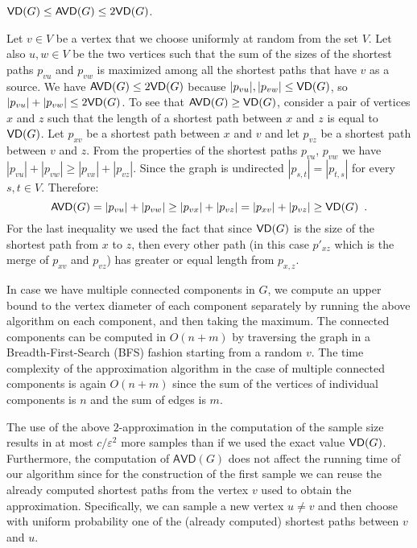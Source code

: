 \begin{lemma}\label{lem:diam}
  $\mathsf{VD}(G)\le\mathsf{AVD}(G)\le 2\mathsf{VD}(G)$.
\end{lemma}
\begin{IEEEproof}
  Let $v\in V$ be a vertex that we choose uniformly at random from the set $V$.
  Let also $u,w\in V$ be the two vertices such that the sum of the sizes of the
  shortest paths $p_{vu}$ and $p_{vw}$ is maximized among all the shortest paths
  that have $v$ as a source.  We have $\mathsf{AVD}(G)\le 2\mathsf{VD}(G)$ because
  $|p_{vu}|,|p_{vw}|\le\mathsf{VD}(G)$, so $|p_{vu}|+|p_{vw}|\le 2\mathsf{VD}(G)$. To see
  that $\mathsf{AVD}(G)\ge\mathsf{VD}(G)$, consider a pair of vertices $x$ and $z$ such
  that the length of a shortest path between $x$ and $z$ is equal to $\mathsf{VD}(G)$.
  Let $p_{xv}$ be a shortest path between $x$ and $v$ and let $p_{vz}$ be a
  shortest path between $v$ and $z$. 
  From the properties of the shortest paths $p_{vu}$, $p_{vw}$ we have
  $|p_{vu}|+|p_{vw}|\geq |p_{vx}|+|p_{vz}|$. Since the graph is undirected
  $|p_{s,t}|=|p_{t,s}|$ for every $s,t\in V$.
  Therefore:
  \[
    \mathsf{AVD}(G) = |p_{vu}|+|p_{vw}|\geq |p_{vx}|+|p_{vz}| =
    |p_{xv}|+|p_{vz}|\ge\mathsf{VD}(G)\enspace. 
  \]
  For the last inequality we used the fact that since $\mathsf{VD}(G)$ is the size of
  the shortest path from $x$ to $z$, then every other path (in this case
  $p'_{xz}$ which is the merge of $p_{xv}$ and $p_{vz}$) has greater or equal
  length from $p_{x,z}$.
\end{IEEEproof}

In case we have multiple connected components in $G$, we compute an upper bound
to the vertex diameter of each component separately by running the above
algorithm on each component, and then taking the maximum. 
The connected components can be computed in $O(n+m)$ by traversing the graph in
a Breadth-First-Search (BFS) fashion starting from a random $v$.
The time complexity of the approximation algorithm in the case of multiple
connected components is again $O(n+m)$ since the sum of the vertices of
individual components is $n$ and the sum of edges is $m$. 

The use of the above $2$-approximation in the computation of the
sample size results in at most $c/\varepsilon^2$ more samples than if we
used the exact value $\mathsf{VD}(G)$. Furthermore, the computation of $\mathsf{AVD}(G)$
does not affect the running time of our algorithm since for the construction of
the first sample we can reuse the already computed shortest paths from the
vertex $v$ used to obtain the approximation. Specifically, we can sample a new
vertex $u\neq v$ and then choose with uniform probability one of the
(already computed) shortest paths between $v$ and $u$.

